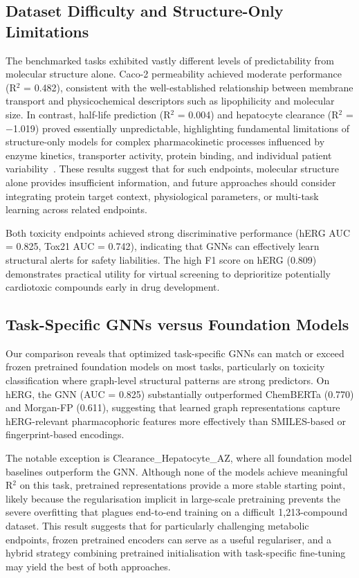 \documentclass[12pt]{article}
\begin{document}
\subsection{Dataset Difficulty and Structure-Only Limitations}

The benchmarked tasks exhibited vastly different levels of predictability from molecular structure alone. Caco-2 permeability achieved moderate performance (R$^2$ = 0.482), consistent with the well-established relationship between membrane transport and physicochemical descriptors such as lipophilicity and molecular size. In contrast, half-life prediction (R$^2$ = 0.004) and hepatocyte clearance (R$^2$ = $-$1.019) proved essentially unpredictable, highlighting fundamental limitations of structure-only models for complex pharmacokinetic processes influenced by enzyme kinetics, transporter activity, protein binding, and individual patient variability~\cite{obach1999prediction}. These results suggest that for such endpoints, molecular structure alone provides insufficient information, and future approaches should consider integrating protein target context, physiological parameters, or multi-task learning across related endpoints.

Both toxicity endpoints achieved strong discriminative performance (hERG AUC = 0.825, Tox21 AUC = 0.742), indicating that GNNs can effectively learn structural alerts for safety liabilities. The high F1 score on hERG (0.809) demonstrates practical utility for virtual screening to deprioritize potentially cardiotoxic compounds early in drug development.

\subsection{Task-Specific GNNs versus Foundation Models}

Our comparison reveals that optimized task-specific GNNs can match or exceed frozen pretrained foundation models on most tasks, particularly on toxicity classification where graph-level structural patterns are strong predictors. On hERG, the GNN (AUC = 0.825) substantially outperformed ChemBERTa (0.770) and Morgan-FP (0.611), suggesting that learned graph representations capture hERG-relevant pharmacophoric features more effectively than SMILES-based or fingerprint-based encodings.

The notable exception is Clearance\_Hepatocyte\_AZ, where all foundation model baselines outperform the GNN. Although none of the models achieve meaningful R$^2$ on this task, pretrained representations provide a more stable starting point, likely because the regularisation implicit in large-scale pretraining prevents the severe overfitting that plagues end-to-end training on a difficult 1{,}213-compound dataset. This result suggests that for particularly challenging metabolic endpoints, frozen pretrained encoders can serve as a useful regulariser, and a hybrid strategy combining pretrained initialisation with task-specific fine-tuning may yield the best of both approaches.
\end{document}
